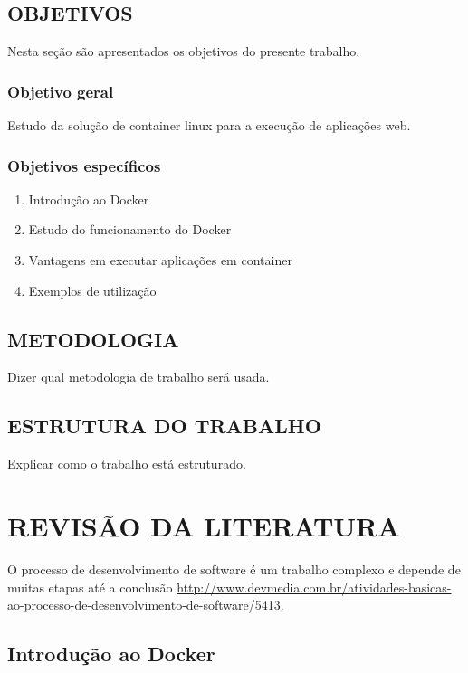 \documentclass[
	12pt,				%
	openright,			%
	oneside,			%
	a4paper,			%
	chapter=TITLE,		%
	section=TITLE,		%
	english,			%
	french,				%
	spanish,			%
	brazil				%
	]{abntex2}
\begin{document}
\section{OBJETIVOS}

Nesta seção são apresentados os objetivos do presente trabalho.

\subsection{Objetivo geral}

Estudo da solução de container linux para a execução de aplicações web.

\subsection{Objetivos específicos}

\begin{enumerate}
	\item{Introdução ao Docker}
	\item{Estudo do funcionamento do Docker}
	\item{Vantagens em executar aplicações em container}
	\item{Exemplos de utilização}
\end{enumerate}

\section{METODOLOGIA}

Dizer qual metodologia de trabalho será usada.

\section{ESTRUTURA DO TRABALHO}

Explicar como o trabalho está estruturado.

\chapter{REVISÃO DA LITERATURA}\label{cap-revisao}

O processo de desenvolvimento de software é um trabalho complexo e depende de muitas etapas até a conclusão \url{http://www.devmedia.com.br/atividades-basicas-ao-processo-de-desenvolvimento-de-software/5413}.

\section{Introdução ao Docker}
\end{document}
